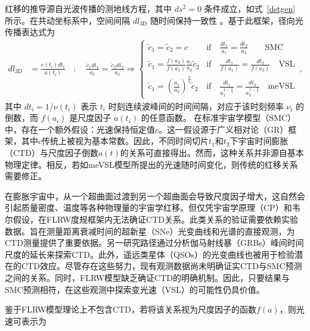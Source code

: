 \documentclass[jkps,preprint,fleqn]{revtex4}
\newcommand{\tc}{\tilde{c}}
\begin{document}
红移的推导源自光波传播的测地线方程，其中 $ds^2 = 0$ 条件成立，如式~\eqref{dstgen} 所示。在共动坐标系中，空间间隔 $dl_{3\textrm{D}}$ 随时间保持一致性 \cite{Lee:2024mal,Lee:2024zcu}。基于此框架，径向光传播表达式为
\begin{align}
d l_{3\textrm{D}} &= \frac{c(t_i) dt_i}{a(t_i)} \quad : \quad \frac{\tc_1 dt_1}{a_1} = \frac{\tc_2 dt_2}{a_2} \Rightarrow \begin{cases} \tc_1 = \tc_2 = c & \textrm{if} \quad \frac{dt_1}{a_1} = \frac{dt_2}{a_2} \qquad \textrm{SMC} \\
\tc_1 = \frac{f(a_2)}{f(a_1)} \frac{a_1}{a_2} \tc_2 & \textrm{if} \quad \frac{dt_1}{f(a_1)} = \frac{dt_2}{f(a_2)} \quad \textrm{VSL} \\ \tc_1 = \left( \frac{a_1}{a_2}\right)^{\frac{b}{4}} \tc_2 & \textrm{if} \quad \frac{dt_1}{a_1^{1-\frac{b}{4}}} = \frac{dt_2}{a_2^{1-\frac{b}{4}}} \quad \textrm{meVSL}  \end{cases} \,, \label{dl3D}
\end{align}
其中 $dt_i = 1/\nu(t_i)$ 表示 $t_i$ 时刻连续波峰间的时间间隔，对应于该时刻频率 $\nu_i$ 的倒数，而 $f(a_i)$ 是尺度因子 $a(t_i)$ 的任意函数。
在标准宇宙学模型（SMC）中，存在一个额外假设：光速保持恒定值$c$。这一假设源于广义相对论（GR）框架，其中$c$传统上被视为基本常数。因此，不同时间切片$t_1$和$t_2$下宇宙时间膨胀（CTD）与尺度因子倒数$a(t)$的关系可直接得出。然而，这种关系并非源自基本物理定律。相反，若如meVSL模型所提出的光速随时间变化，则传统的红移关系需要修正。

在膨胀宇宙中，从一个超曲面过渡到另一个超曲面会导致尺度因子增大，这自然会引起质量密度、温度等各种物理量的宇宙学红移。但仅凭宇宙学原理（CP）和韦尔假设，在FLRW度规框架内无法确证CTD关系。此类关系的验证需要依赖实验数据。旨在测量距离衰减时间的超新星（SNe）光变曲线和光谱的直接观测，为CTD测量提供了重要依据\cite{Leibundgut:1996qm,SupernovaSearchTeam:1997gem,Foley:2005qu,Blondin:2007ua,Blondin:2008mz,Lee:2023ucu,DES:2024vgg,Lee:2024kxa}。另一研究路径通过分析伽马射线暴（GRBs）峰间时间尺度的延长来探索CTD\cite{Norris:1993hda,Wijers:1994qf,Band:1994ee,Meszaros:1995gj,Lee:1996zu,Chang:2001fy,Crawford:2009be,Zhang:2013yna,Singh:2021jgr}。此外，遥远类星体（QSOs）的光变曲线也被用于检验潜在的CTD效应\cite{Hawkins:2001be,Dai:2012wp,Lewis:2023jab}。尽管存在这些努力，现有观测数据尚未明确证实CTD与SMC预测之间的关系。同时，FLRW模型缺乏确证CTD的明确机制。因此，只要结果与SMC预测相符，在这些观测中探索变光速（VSL）的可能性仍具价值。

鉴于FLRW模型理论上不包含CTD，若将该关系视为尺度因子的函数$f(a)$，则光速可表示为
\end{document}
